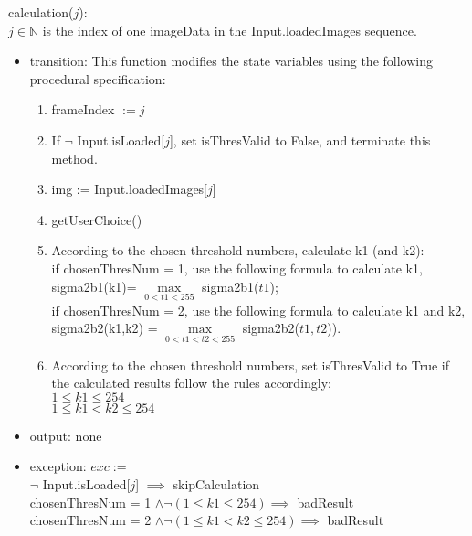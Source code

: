 \documentclass[12pt, titlepage]{article}
\begin{document}
\noindent calculation($j$):\\
$j \in \mathbb{N}$ is the index of one imageData in the Input.loadedImages
sequence.
\begin{itemize}
\item transition: 
This function modifies
the state variables using the following procedural specification:
\begin{enumerate}
\item frameIndex $:= j$
\item If $\neg$ Input.isLoaded[$j$], set isThresValid to False, and terminate
this method.
\item img := Input.loadedImages[$j$]
\item getUserChoice()
\item According to the chosen threshold numbers, calculate k1 (and k2):\\
if chosenThresNum = 1, use the following formula to calculate k1,\\
sigma2b1(k1)= $\max\limits_{0< t1<255}$ sigma2b1($t1$);\\
if chosenThresNum = 2, use the following formula to calculate k1 and k2,\\
sigma2b2(k1,k2) =
$\max\limits_{0<t1<t2<255}$ sigma2b2($t1,t2$)).
\item According to the chosen threshold numbers, set isThresValid to True if
the calculated results follow the rules accordingly:\\
$1 \le k1 \le 254$\\
$1 \le k1 < k2 \le 254$
\end{enumerate}
\item output: none
\item exception: $exc :=$\\
$\neg$ Input.isLoaded[$j$] $\implies$ skipCalculation\\
chosenThresNum = 1 $\land \neg (1 \le k1 \le 254) \implies$
badResult\\
chosenThresNum = 2 $\land \neg (1 \le k1 < k2 \le 254) \implies$ badResult
\end{itemize}
\end{document}
